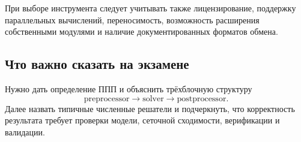 При выборе инструмента следует учитывать также лицензирование, поддержку
параллельных вычислений, переносимость, возможность расширения собственными
модулями и наличие документированных форматов обмена.


\subsection{Что важно сказать на экзамене}

Нужно дать определение ППП и объяснить трёхблочную структуру
\[
\boxed{\text{preprocessor}\rightarrow\text{solver}\rightarrow\text{postprocessor}}.
\]
Далее назвать типичные численные решатели и подчеркнуть, что корректность результата требует проверки модели, сеточной сходимости, верификации и валидации.

\newpage
